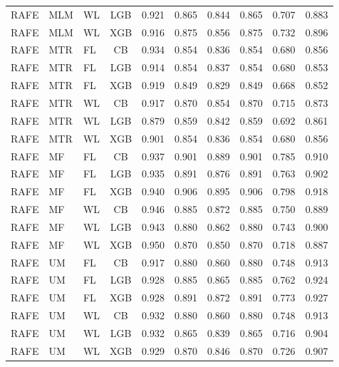 \documentclass[9pt,a4paper]{article}
\begin{document}
\begin{scriptsize}
\begin{longtable}{lllcrrrrrr}
RAFE & MLM & WL & LGB & 0.921 & 0.865 & 0.844 & 0.865 & 0.707 & 0.883 \\
RAFE & MLM & WL & XGB & 0.916 & 0.875 & 0.856 & 0.875 & 0.732 & 0.896 \\
RAFE & MTR & FL & CB  & 0.934 & 0.854 & 0.836 & 0.854 & 0.680 & 0.856 \\
RAFE & MTR & FL & LGB & 0.914 & 0.854 & 0.837 & 0.854 & 0.680 & 0.853 \\
RAFE & MTR & FL & XGB & 0.919 & 0.849 & 0.829 & 0.849 & 0.668 & 0.852 \\
RAFE & MTR & WL & CB  & 0.917 & 0.870 & 0.854 & 0.870 & 0.715 & 0.873 \\
RAFE & MTR & WL & LGB & 0.879 & 0.859 & 0.842 & 0.859 & 0.692 & 0.861 \\
RAFE & MTR & WL & XGB & 0.901 & 0.854 & 0.836 & 0.854 & 0.680 & 0.856 \\
RAFE & MF  & FL & CB  & 0.937 & 0.901 & 0.889 & 0.901 & 0.785 & 0.910 \\
RAFE & MF  & FL & LGB & 0.935 & 0.891 & 0.876 & 0.891 & 0.763 & 0.902 \\
RAFE & MF  & FL & XGB & 0.940 & 0.906 & 0.895 & 0.906 & 0.798 & 0.918 \\
RAFE & MF  & WL & CB  & 0.946 & 0.885 & 0.872 & 0.885 & 0.750 & 0.889 \\
RAFE & MF  & WL & LGB & 0.943 & 0.880 & 0.862 & 0.880 & 0.743 & 0.900 \\
RAFE & MF  & WL & XGB & 0.950 & 0.870 & 0.850 & 0.870 & 0.718 & 0.887 \\
RAFE & UM  & FL & CB  & 0.917 & 0.880 & 0.860 & 0.880 & 0.748 & 0.913 \\
RAFE & UM  & FL & LGB & 0.928 & 0.885 & 0.865 & 0.885 & 0.762 & 0.924 \\
RAFE & UM  & FL & XGB & 0.928 & 0.891 & 0.872 & 0.891 & 0.773 & 0.927 \\
RAFE & UM  & WL & CB  & 0.932 & 0.880 & 0.860 & 0.880 & 0.748 & 0.913 \\
RAFE & UM  & WL & LGB & 0.932 & 0.865 & 0.839 & 0.865 & 0.716 & 0.904 \\
RAFE & UM  & WL & XGB & 0.929 & 0.870 & 0.846 & 0.870 & 0.726 & 0.907 \\
\end{longtable}
\end{scriptsize}

\newpage

\end{document}
